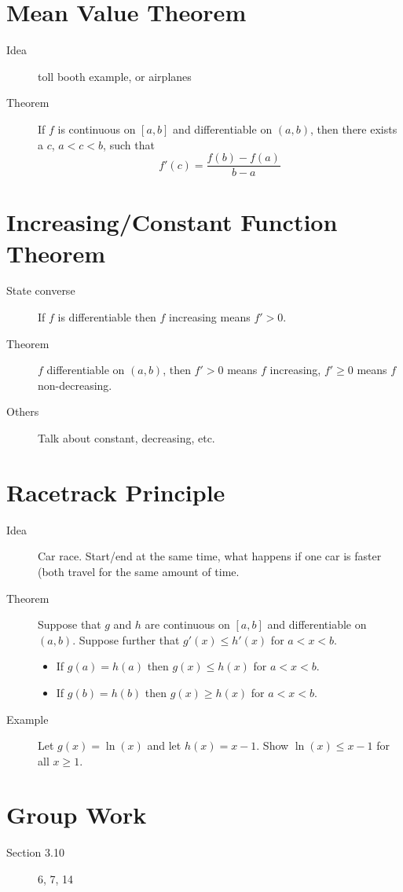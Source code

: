 \documentclass[11pt]{article}
\begin{document}
\drawtitle

\section*{Mean Value Theorem}
\begin{description}
\item[Idea] toll booth example, or airplanes
\item[Theorem] If $f$ is continuous on $[a,b]$ and differentiable on
  $(a,b)$, then there exists a $c$, $a<c<b$, such that
\[
f'(c)=\dfrac{f(b)-f(a)}{b-a}
\]

\end{description}

\section*{Increasing/Constant Function Theorem}
\begin{description}
\item[State converse] If $f$ is differentiable then $f$ increasing means
  $f'>0$.
\item[Theorem] $f$ differentiable on $(a,b)$, then $f'>0$ means $f$
increasing, $f'\geq 0$ means $f$ non-decreasing.
\item[Others] Talk about constant, decreasing, etc.
\end{description}

\section*{Racetrack Principle}
\begin{description}
\item[Idea] Car race.  Start/end at the same time, what happens if one car
  is faster (both travel for the same amount of time.
\item[Theorem] Suppose that $g$ and $h$ are continuous on $[a,b]$ and
  differentiable on $(a,b)$.  Suppose further that $g'(x)\leq h'(x)$ for
  $a<x<b$.
  \begin{itemize}
    \item If $g(a)=h(a)$ then $g(x)\leq h(x)$ for $a<x<b$.  
    \item If $g(b)=h(b)$ then $g(x)\geq h(x)$ for $a<x<b$.  
  \end{itemize}

\item[Example] Let $g(x)=\ln(x)$ and let $h(x)=x-1$. Show $\ln(x)\leq x-1$
  for all $x\geq 1$.
\end{description}

\section*{Group Work}
\begin{description}
\item[Section 3.10] 6, 7, 14
\end{description}
\end{document}
